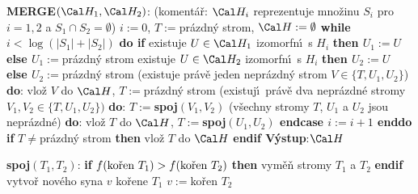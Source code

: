 {\bf MERGE$(\Cal H_1,\Cal H_2)$}:\newline 
(koment\'a\v r: $\Cal H_i$ reprezentuje mno\v zinu $S_i$ pro $i=1
,2$ a $S_1\cap S_2=\emptyset$)\newline 
$i:=0$, $T:=$pr\'azdn\'y strom, $\Cal H:=\emptyset$\newline 
{\bf while} $i<\log(|S_1|+|S_2|)$ {\bf do\newline 
\phantom{{\rm ---}}if} existuje $U\in \Cal H_1$ izomorfn\'\i\ s $
H_i$ {\bf then\newline 
\phantom{{\rm ------}}$U_1:=U$\newline 
\phantom{{\rm ---}}else\newline 
\phantom{{\rm ------}}$U_1:=$}pr\'azdn\'y strom\newline 
{} existuje $U\in \Cal H_2$ izomorfn\'\i\ s $
H_i$ {\bf then\newline 
\phantom{{\rm ------}}$U_2:=U$\newline 
\phantom{{\rm ---}}else\newline 
\phantom{{\rm ------}}$U_2:=$}pr\'azdn\'y strom\newline 
{}(existuje pr\'av\v e jeden nepr\'azdn\'y strom 
$V\in \{T,U_1,U_2\}$) {\bf do}:\newline 
\phantom{---------}vlo\v z $V$ do $\Cal H$, $T:=$pr\'azdn\'y strom\newline 
\phantom{------}(existuj\'\i\ pr\'av\v e dva nepr\'azdn\'e stromy 
$V_1,V_2\in \{T,U_1,U_2\})$ {\bf do}:\newline 
\phantom{---------}$T:=${\bf spoj$(V_1,V_2)$\newline 
\phantom{{\rm ------}}}(v\v sechny stromy $T$, $U_1$ a $U_2$ jsou nepr\'azdn\'e) {\bf do}:\newline 
\phantom{---------}vlo\v z $T$ do $\Cal H$, $T:=${\bf spoj$(U_1,U_
2)$\newline 
\phantom{{\rm ---}}endcase\newline 
\phantom{{\rm ---}}$i:=i+1$\newline 
enddo\newline 
if} $T\ne$pr\'azdn\'y strom {\bf then} vlo\v z $T$ do $\Cal H$ {\bf endif\newline 
V\'ystup}:$\Cal H$
\bigskip

{\bf spoj$(T_1,T_2)$}:\newline 
{\bf if} $f(\text{\rm ko\v ren }T_1)>f(\text{\rm ko\v ren }T_2)$ {\bf then\newline 
\phantom{{\rm ---}}}vym\v e\v n stromy $T_1$ a $T_2$\newline 
{\bf endif\newline 
}
vytvo\v r nov\'eho  syna $v$ ko\v rene $T_1$\newline 
$v:=$ko\v ren $T_2$
\bigskip

